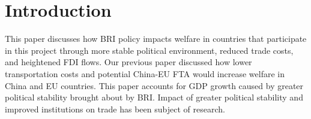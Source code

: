 \section{Introduction}
This paper discusses how BRI policy impacts welfare in countries that participate in this project through more stable political environment, reduced trade costs, and heightened FDI flows.
Our previous paper discussed how lower transportation costs and potential China-EU FTA would increase welfare in China and EU countries. This paper accounts for GDP growth caused by greater political stability brought about by BRI. Impact of greater political stability and improved institutions on trade has been subject of research.  
